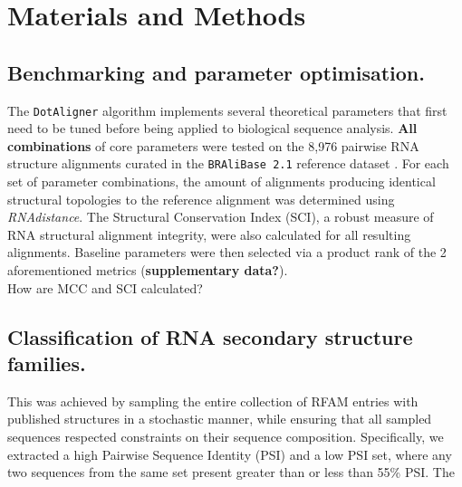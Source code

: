 \documentclass[a4paper,11pt]{article}
\newcommand\dotaligner{\texttt{DotAligner}}
\newcommand\bralibase{\texttt{BRAliBase 2.1}}
\begin{document}
{%
\section*{ Materials and Methods }
\subsection*{ Benchmarking and parameter optimisation. }
The \dotaligner{} algorithm implements several theoretical parameters that first need to 
be tuned before being applied to biological sequence analysis.\textbf{ All combinations} of 
core parameters were tested on the 8,976 pairwise RNA structure alignments curated in the 
\bralibase{} reference dataset \cite{Wilm2006enhanced}. For each set of parameter combinations, 
the amount of alignments producing identical structural topologies to the reference alignment
was determined using \textit{RNAdistance}. The Structural Conservation Index (SCI), a robust 
measure of RNA structural alignment integrity, were  also calculated for all resulting alignments. 
Baseline parameters were then selected via a product rank of the 2 aforementioned metrics 
(\textbf{supplementary data?}).\\

{\color{red} How are MCC and SCI calculated? }\\

\subsection*{ Classification of RNA secondary structure families. }
This was achieved by sampling the entire collection of RFAM entries with published structures 
in a stochastic manner, while ensuring that all sampled sequences respected constraints 
on their sequence composition. Specifically, we extracted a high Pairwise Sequence Identity (PSI) 
and a low PSI set, where any two sequences from the same set present greater than or less than 
55\% PSI. The 

}
\end{document}
